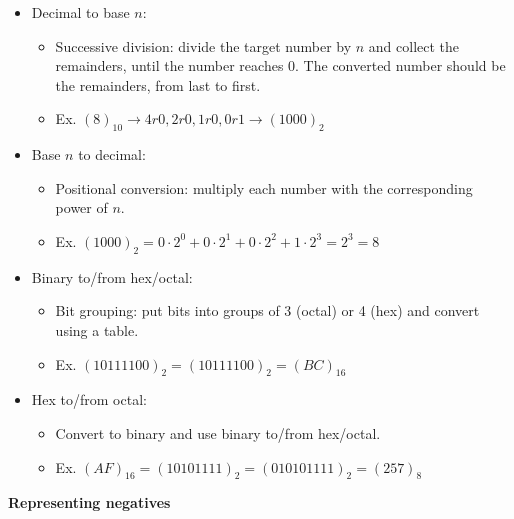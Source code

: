 \documentclass{article}
\begin{document}
\begin{itemize}
    \item Decimal to base $n$:
    \begin{itemize}
        \item Successive division: divide the target number by $n$ and collect the remainders, until the number reaches 0. The converted number should be the remainders, from last to first.
        \item Ex. $(8)_{10} \rightarrow 4 r 0, 2 r 0, 1 r 0, 0 r 1 \rightarrow (1000)_2$
    \end{itemize}
    \item Base $n$ to decimal:
    \begin{itemize}
        \item Positional conversion: multiply each number with the corresponding power of $n.$
        \item Ex. $(1000)_2 = 0 \cdot 2^0 + 0 \cdot 2^1 + 0 \cdot 2^2 + 1\cdot 2^3 = 2^3 = 8$
    \end{itemize}
    \item Binary to/from hex/octal:
    \begin{itemize}
        \item Bit grouping: put bits into groups of 3 (octal) or 4 (hex) and convert using a table.
        \item Ex. $(10111100)_2 = (1011 1100)_2 = (BC)_{16}$
    \end{itemize}
    \item Hex to/from octal:
    \begin{itemize}
        \item Convert to binary and use binary to/from hex/octal.
        \item Ex. $(AF)_{16} = (1010 1111)_2 = (010 101 111)_2 = (257)_8$
    \end{itemize}
\end{itemize}
\textbf{Representing negatives}
\end{document}
